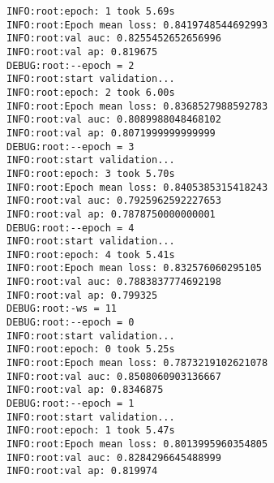 \documentclass[11pt]{article}
\begin{document}
\begin{verbatim}
INFO:root:epoch: 1 took 5.69s
INFO:root:Epoch mean loss: 0.8419748544692993
INFO:root:val auc: 0.8255452652656996
INFO:root:val ap: 0.819675
DEBUG:root:--epoch = 2
INFO:root:start validation...
INFO:root:epoch: 2 took 6.00s
INFO:root:Epoch mean loss: 0.8368527988592783
INFO:root:val auc: 0.8089988048468102
INFO:root:val ap: 0.8071999999999999
DEBUG:root:--epoch = 3
INFO:root:start validation...
INFO:root:epoch: 3 took 5.70s
INFO:root:Epoch mean loss: 0.8405385315418243
INFO:root:val auc: 0.7925962592227653
INFO:root:val ap: 0.7878750000000001
DEBUG:root:--epoch = 4
INFO:root:start validation...
INFO:root:epoch: 4 took 5.41s
INFO:root:Epoch mean loss: 0.832576060295105
INFO:root:val auc: 0.7883837774692198
INFO:root:val ap: 0.799325
DEBUG:root:-ws = 11
DEBUG:root:--epoch = 0
INFO:root:start validation...
INFO:root:epoch: 0 took 5.25s
INFO:root:Epoch mean loss: 0.7873219102621078
INFO:root:val auc: 0.8508060903136667
INFO:root:val ap: 0.8346875
DEBUG:root:--epoch = 1
INFO:root:start validation...
INFO:root:epoch: 1 took 5.47s
INFO:root:Epoch mean loss: 0.8013995960354805
INFO:root:val auc: 0.8284296645488999
INFO:root:val ap: 0.819974
\end{verbatim}
\end{document}
